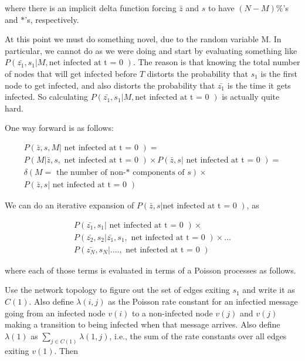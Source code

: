 \documentclass{article}
\begin{document}
where there is an implicit delta function forcing $\bar{z}$ and $s$ to have $(N - M) \%$'s and $*$'s, respectively.

At this point we must do something novel, due to the random variable M. In particular,
we cannot do as we were doing and start by evaluating something like
$P(\bar{z_1}, s_1 | M, \text{net infected at t = 0 })$. The reason is that knowing the total number
of nodes that will get infected before $T$ distorts the probability that $s_1$ is the first
node to get infected, and also distorts the probability that $\bar{z_1}$ is the time it gets infected.
So calculating $P(\bar{z_1}, s_1 | M, \text{net infected at t = 0 })$ is actually quite hard.

One way forward is as follows:

\begin{align}
P(\bar{z}, s, M | \text{ net infected at t = 0 }) = \\ \nonumber
P(M | \bar{z}, s, \text{ net infected at t = 0 })  \times  P(\bar{z}, s | \text{ net infected at t = 0 }) = \\  \nonumber
\delta(M = \text{ the number of non-* components of } s)  \times \\
P(\bar{z}, s | \text{ net infected at t = 0 })
\end{align}


We can do an iterative expansion of $P(\bar{z}, s | \text{net infected at t = 0 })$,
 as

\begin{align}
P(\bar{z_1}, s_1 | \text{ net infected at t = 0 }) \times \\ \nonumber
P(\bar{z_2}, s_2 | \bar{z_1}, s_1, \text{ net infected at t = 0 }) \times ... \\ \nonumber
P(\bar{z_N}, s_N  | ...., \text{ net infected at t = 0 })
\end{align}

where each of those terms is evaluated in terms of a Poisson processes as follows.  


        Use the network topology to figure out the set of edges exiting
	$s_1$ and write it as $C(1)$. Also define $\lambda(i,j)$ as the Poisson rate
	constant for an infectied message going from an infected node $v(i)$ 
        to a non-infected node $v(j)$ and $v(j)$ making a transition to being infected when 
        that message arrives.  Also define $\lambda(1)$ as $\sum_{j \in C(1)} \lambda(1,j)$,
	i.e., the sum of the rate constants over all edges exiting $v(1)$. Then
\end{document}
